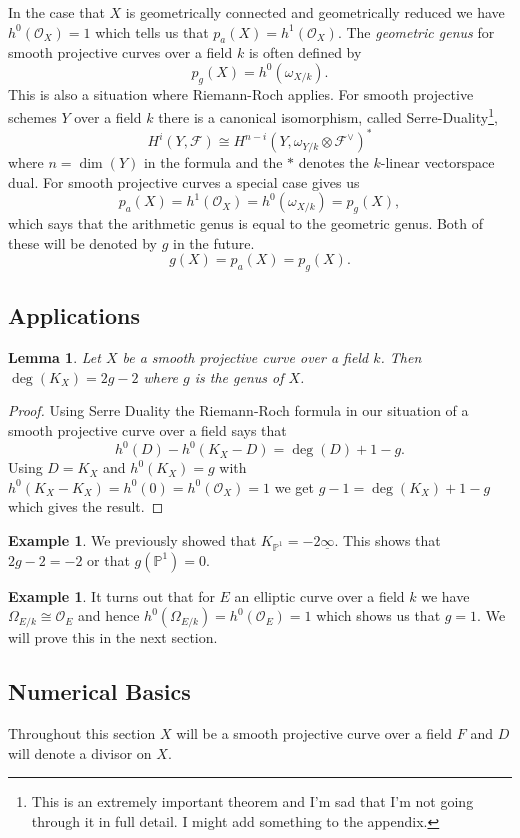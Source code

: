 \documentclass[12pt]{article}
\numberwithin{equation}{section}
\newtheorem{lemma}[theorem]{Lemma}
\theoremstyle{definition}
\newtheorem{example}[theorem]{Example}
\theoremstyle{remark}
\newcommand{\Ocal}{\mathcal{O}}
\newcommand{\PP}{\mathbb{P}}
\newcommand{\Fcal}{\mathcal{F}}
\begin{document}
In the case that $X$ is geometrically connected and geometrically reduced we have $h^0(\Ocal_X) = 1$ which tells us that $p_a(X) = h^1(\Ocal_X)$. 
The \emph{geometric genus} for smooth projective curves over a field $k$ is often defined by 
 $$p_g(X) = h^0(\omega_{X/k}).$$
This is also a situation where Riemann-Roch applies. 
For smooth projective schemes $Y$ over a field $k$ there is a canonical isomorphism, called Serre-Duality\footnote{This is an extremely important theorem and I'm sad that I'm not going through it in full detail. I might add something to the appendix.}, 
 $$ H^i(Y,\Fcal) \cong H^{n-i}(Y,\omega_{Y/k}\otimes \Fcal^{\vee})^* $$
where $n=\dim(Y)$ in the formula and the $*$ denotes the $k$-linear vectorspace dual. 
For smooth projective curves a special case gives us
 $$ p_a(X) = h^1(\Ocal_X) = h^0(\omega_{X/k}) = p_g(X), $$
which says that the arithmetic genus is equal to the geometric genus.
Both of these will be denoted by $g$ in the future.  
$$ g(X) = p_a(X) = p_g(X).$$

\subsection{Applications}

\begin{lemma}
	Let $X$ be a smooth projective curve over a field $k$. 
	Then $\deg(K_X) = 2g-2$ where $g$ is the genus of $X$. 
\end{lemma}
\begin{proof}
	Using Serre Duality the Riemann-Roch formula in our situation of a smooth projective curve over a field says that 
	 $$ h^0(D) - h^0(K_X-D) = \deg(D) + 1-g. $$
	Using $D = K_X$ and $h^0(K_X)=g$ with $h^0(K_X-K_X) = h^0(0) = h^0(\Ocal_X)=1$ we get 
	$g - 1 = \deg(K_X) + 1-g$ which gives the result.
\end{proof}

\begin{example}
	We previously showed that $K_{\PP^1} = -2\underline{\infty}$. 
	This shows that $2g-2=-2$ or that $g(\PP^1)=0$. 
\end{example}

\begin{example}
	It turns out that for $E$ an elliptic curve over a field $k$ we have $\Omega_{E/k} \cong \Ocal_{E}$ and hence $h^0(\Omega_{E/k}) = h^0(\Ocal_E)=1$ which shows 
	us that $g=1$. 
	We will prove this in the next section.
\end{example}

\subsection{Numerical Basics}
Throughout this section $X$ will be a smooth projective curve over a field $F$ and $D$ will denote a divisor on $X$. 
\end{document}
